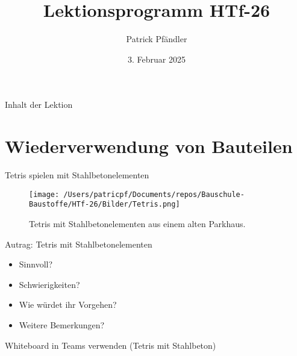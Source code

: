 \def\customoptions{aspectratio=169} %



\title{\textbf{Lektionsprogramm HTf-26}}
\author{Patrick Pfändler}
\date{3. Februar 2025}




\frame{\titlepage}

\begin{frame}{Inhalt der Lektion}
    \tableofcontents
\end{frame}



\section{Wiederverwendung von Bauteilen}
\begin{frame}{Tetris spielen mit Stahlbetonelementen}

    \begin{figure}[H]
        \centering
        \texttt{[image: /Users/patricpf/Documents/repos/Bauschule-Baustoffe/HTf-26/Bilder/Tetris.png]}
        \caption{Tetris mit Stahlbetonelementen aus einem alten Parkhaus.}
    \end{figure}


\end{frame}

\begin{frame}{Autrag: Tetris mit Stahlbetonelementen}

    \begin{Fragenblock}
        \begin{itemize}
            \item Sinnvoll? 
            \item Schwierigkeiten? 
            \item Wie würdet ihr Vorgehen? 
            \item Weitere Bemerkungen?
        \end{itemize}
    \end{Fragenblock}
    \vspace{1cm}

    Whiteboard in Teams verwenden (Tetris mit Stahlbeton)


\end{frame}



